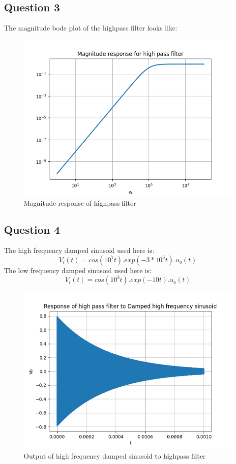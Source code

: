 \documentclass[11pt, a4paper]{article}
\begin{document}
\subsection*{Question 3}
The magnitude bode plot of the highpass filter looks like:
\begin{figure}[!tbh]
\centering
\includegraphics[scale=0.5]{assgn8_plot4.png} 
\caption{Magnitude response of highpass filter}
\label{fig5}
\end{figure}

\subsection*{Question 4}
The high frequency damped sinusoid used here is:
\begin{equation*}
 V_i(t)=cos(10^7 t).exp(-3*10^3 t).u_o(t)
\end{equation*}
\newline
The low frequency damped sinusoid used here is:
\begin{equation*}
 V_i(t)=cos(10^3 t).exp(-10t).u_o(t)
\end{equation*}

\begin{figure}[!tbh]
\centering
\includegraphics[scale=0.5]{assgn8_plot6.png} 
\caption{Output of high frequency damped sinusoid to highpass filter}
\label{fig6}
\end{figure}
\end{document}
